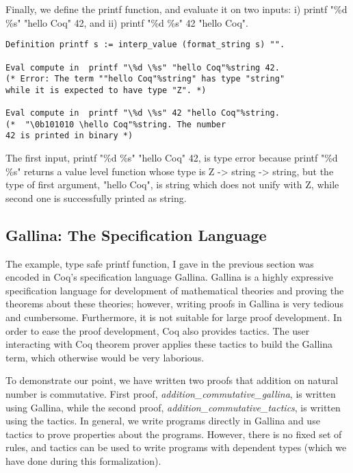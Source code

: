 \noindent
Finally, we define the printf function, and evaluate it on two inputs: 
i)  printf "\%d \%s" "hello Coq" 42, and ii)  printf "\%d \%s" 42 "hello Coq".

\begin{verbatim}
Definition printf s := interp_value (format_string s) "".           

Eval compute in  printf "\%d \%s" "hello Coq"%string 42.
(* Error: The term ""hello Coq"%string" has type "string" 
while it is expected to have type "Z". *)

Eval compute in  printf "\%d \%s" 42 "hello Coq"%string. 
(*  "\0b101010 \hello Coq"%string. The number 
42 is printed in binary *)                            
\end{verbatim}
The first input, printf "\%d \%s" "hello Coq" 42, is type error because 
printf "\%d \%s" returns a value level function whose  type is Z -> string -> string, but 
the type of first argument, "hello Coq", is string which does not unify with Z,
while second one is successfully printed as string. 

  
  

 
 \subsection{Gallina: The Specification Language}
 \label{sec:gallina}
  The example, type safe printf function, I gave in the previous 
  section was encoded in Coq's specification language Gallina. 
  Gallina is a highly expressive specification 
  language for development of mathematical theories and proving the    
  theorems about these  theories; however, writing proofs in Gallina
  is very tedious and cumbersome. Furthermore,  it is not suitable for large proof 
  development. In order to ease the proof development, Coq also provides 
  tactics.  The user interacting with Coq theorem prover applies these 
  tactics to build the  Gallina term,  which otherwise would  
  be very laborious.
  
 To demonstrate our point, we have written two proofs that addition on natural number is commutative. 
 First proof, \textit{addition\_commutative\_gallina}, is written using 
 Gallina, while the second proof, \textit{addition\_commutative\_tactics}, is written 
 using the tactics.  In general, we write programs directly in Gallina and use tactics 
 to prove properties about the programs. However, there is no fixed set of rules, and tactics 
 can be used to write programs with dependent types (which we have done during this
 formalization).
 
